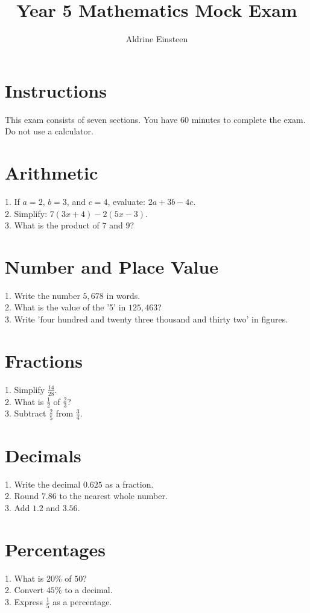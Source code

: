\documentclass{article}
\title{Year 5 Mathematics Mock Exam}
\author{Aldrine Einsteen}
\date{}
\begin{document}
\maketitle

\section*{Instructions}
This exam consists of seven sections. You have 60 minutes to complete the exam. Do not use a calculator.

\section{Arithmetic}
1. If $a=2$, $b=3$, and $c=4$, evaluate: $2a + 3b - 4c$. \\
2. Simplify: $7(3x+4)-2(5x-3)$. \\
3. What is the product of $7$ and $9$? \\

\section{Number and Place Value}
1. Write the number $5,678$ in words. \\
2. What is the value of the '5' in $125,463$? \\
3. Write 'four hundred and twenty three thousand and thirty two' in figures. \\

\section{Fractions}
1. Simplify $\frac{14}{28}$. \\
2. What is $\frac{1}{2}$ of $\frac{2}{3}$? \\
3. Subtract $\frac{2}{5}$ from $\frac{3}{4}$. \\

\section{Decimals}
1. Write the decimal $0.625$ as a fraction. \\
2. Round $7.86$ to the nearest whole number. \\
3. Add $1.2$ and $3.56$. \\

\section{Percentages}
1. What is $20\%$ of $50$? \\
2. Convert $45\%$ to a decimal. \\
3. Express $\frac{1}{5}$ as a percentage. \\
\end{document}
